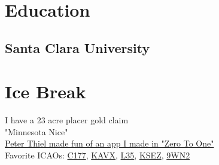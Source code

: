 \documentclass[]{plushcv}
\begin{document}
\begin{minipage}[t]{0.25\textwidth}


\section{Education} 
\subsection{Santa Clara University}

\section{Ice Break}
I have a 23 acre placer gold claim \\
\sectionsep
"Minnesota Nice" \\
\sectionsep
\href{https://books.google.com/books?id=Owc2nQEACAAJ&pg=PA75&source=gbs_selected_pages&cad=3#v=onepage&q=toilet+paper&f=false}{Peter Thiel made fun of an app I made in "Zero To One"} \\
\sectionsep
Favorite ICAOs: \href{https://romanch.uk/files/sedona.jpeg}{C177}, \href{https://www.airnav.com/airport/KAVX}{KAVX}, \href{https://www.airnav.com/airport/L35}{L35}, \href{https://www.airnav.com/airport/KSEZ}{KSEZ}, \href{https://www.airnav.com/airport/9WN2}{9WN2}


\end{minipage} 
\end{document}
